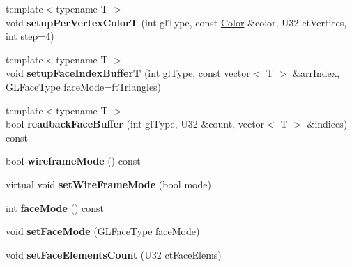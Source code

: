 \begin{DoxyCompactItemize}
\item 
\hypertarget{classps_1_1opengl_1_1GLMesh_a2b8cad1819d0ae4f4fc902f2c202d98e}{}{\footnotesize template$<$typename T $>$ }\\void {\bfseries setup\+Per\+Vertex\+Color\+T} (int gl\+Type, const \hyperlink{classps_1_1base_1_1Color}{Color} \&color, U32 ct\+Vertices, int step=4)\label{classps_1_1opengl_1_1GLMesh_a2b8cad1819d0ae4f4fc902f2c202d98e}

\item 
\hypertarget{classps_1_1opengl_1_1GLMesh_a87a022a8d31a673b336d2f0271fe0cf7}{}{\footnotesize template$<$typename T $>$ }\\void {\bfseries setup\+Face\+Index\+Buffer\+T} (int gl\+Type, const vector$<$ T $>$ \&arr\+Index, G\+L\+Face\+Type face\+Mode=ft\+Triangles)\label{classps_1_1opengl_1_1GLMesh_a87a022a8d31a673b336d2f0271fe0cf7}

\item 
\hypertarget{classps_1_1opengl_1_1GLMesh_a86420e2cf6d18d31ede0367fbfd15400}{}{\footnotesize template$<$typename T $>$ }\\bool {\bfseries readback\+Face\+Buffer} (int gl\+Type, U32 \&count, vector$<$ T $>$ \&indices) const \label{classps_1_1opengl_1_1GLMesh_a86420e2cf6d18d31ede0367fbfd15400}

\item 
\hypertarget{classps_1_1opengl_1_1GLMesh_a200089ac29a7eb872897e7978ae7e2e1}{}bool {\bfseries wireframe\+Mode} () const \label{classps_1_1opengl_1_1GLMesh_a200089ac29a7eb872897e7978ae7e2e1}

\item 
\hypertarget{classps_1_1opengl_1_1GLMesh_a0ac5b90c2581ca7a9394c641a34ca870}{}virtual void {\bfseries set\+Wire\+Frame\+Mode} (bool mode)\label{classps_1_1opengl_1_1GLMesh_a0ac5b90c2581ca7a9394c641a34ca870}

\item 
\hypertarget{classps_1_1opengl_1_1GLMesh_a9e21781ca568ff2b4a9825c3e91032f1}{}int {\bfseries face\+Mode} () const \label{classps_1_1opengl_1_1GLMesh_a9e21781ca568ff2b4a9825c3e91032f1}

\item 
\hypertarget{classps_1_1opengl_1_1GLMesh_abe2bbe4a607cb98faa8c8d62acf6aa83}{}void {\bfseries set\+Face\+Mode} (G\+L\+Face\+Type face\+Mode)\label{classps_1_1opengl_1_1GLMesh_abe2bbe4a607cb98faa8c8d62acf6aa83}

\item 
\hypertarget{classps_1_1opengl_1_1GLMesh_a4a30230bd828ec4661911320c398e6d5}{}void {\bfseries set\+Face\+Elements\+Count} (U32 ct\+Face\+Elems)\label{classps_1_1opengl_1_1GLMesh_a4a30230bd828ec4661911320c398e6d5}


\end{DoxyCompactItemize}
